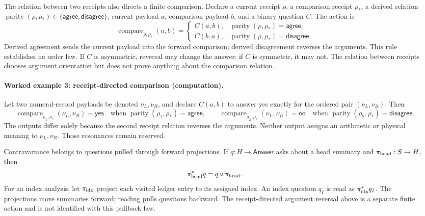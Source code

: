 The relation between two receipts also directs a finite comparison.  Declare a current receipt \(\rho\), a comparison
receipt \(\rho_*\), a derived relation
\(\operatorname{parity}(\rho,\rho_*)\in\{\mathsf{agree},\mathsf{disagree}\}\), current payload \(a\), comparison
payload \(b\), and a binary question \(C\).  The action is
\[
 \operatorname{compare}_{\rho,\rho_*}(a,b)=
 \begin{cases}
 C(a,b),&\operatorname{parity}(\rho,\rho_*)=\mathsf{agree},\\
 C(b,a),&\operatorname{parity}(\rho,\rho_*)=\mathsf{disagree}.
 \end{cases}
\]
Derived agreement sends the current payload into the forward comparison; derived disagreement reverses the arguments.  This rule
establishes no order law.  If \(C\) is asymmetric, reversal may change the answer; if \(C\) is symmetric, it may not.
The relation between receipts chooses argument orientation but does not prove anything about the comparison relation.

\paragraph{Worked example 3: receipt-directed comparison (computation).}
Let two numeral-record payloads be denoted \(\nu_L,\nu_R\), and declare
\(C(a,b)\) to answer yes exactly for the ordered pair \((\nu_L,\nu_R)\).  Then
\[
 \operatorname{compare}_{\rho_1,\rho_*}(\nu_L,\nu_R)=\mathsf{yes}
 \quad\text{when }\operatorname{parity}(\rho_1,\rho_*)=\mathsf{agree},
 \qquad
 \operatorname{compare}_{\rho_2,\rho_*}(\nu_L,\nu_R)=\mathsf{no}
 \quad\text{when }\operatorname{parity}(\rho_2,\rho_*)=\mathsf{disagree}.
\]
The outputs differ solely because the second receipt relation reverses the arguments.  Neither output assigns an
arithmetic or physical meaning to \(\nu_L,\nu_R\).  Those resonances remain reserved.

Contravariance belongs to questions pulled through forward projections.  If
\(q:H\to\mathsf{Answer}\) asks about a head summary and
\(\pi_{\rm head}:S\to H\), then
\[
                       \pi_{\rm head}^*q=q\circ\pi_{\rm head}.
\]
For an index analysis, let \(\pi_{\rm idx}\) project each visited ledger entry to its assigned index.  An index question
\(q_I\) is read as \(\pi_{\rm idx}^*q_I\).  The projections move summaries forward; reading pulls questions backward.
The receipt-directed argument reversal above is a separate finite action and is not identified with this pullback law.

